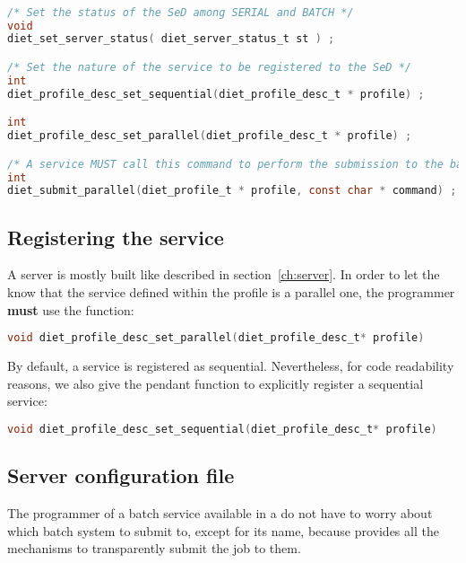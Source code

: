 \begin{lstlisting}[language=C,basewidth={.5em,.4em},fontadjust]

/* Set the status of the SeD among SERIAL and BATCH */
void 
diet_set_server_status( diet_server_status_t st ) ;

/* Set the nature of the service to be registered to the SeD */
int
diet_profile_desc_set_sequential(diet_profile_desc_t * profile) ;

int
diet_profile_desc_set_parallel(diet_profile_desc_t * profile) ;

/* A service MUST call this command to perform the submission to the batch system */
int
diet_submit_parallel(diet_profile_t * profile, const char * command) ;

\end{lstlisting}

\subsection{Registering the service}

A server is mostly built like described in section~\ref{ch:server}. In order to
let the \sed know that the service defined within the profile is a parallel
one, the \sed programmer {\bf must} use the function:

\begin{lstlisting}[language=c,basewidth={.5em,.4em},fontadjust]
void diet_profile_desc_set_parallel(diet_profile_desc_t* profile)
\end{lstlisting}

By default, a service is registered as sequential. Nevertheless, for
code readability reasons, we also give the pendant function to
explicitly register a sequential service:

\begin{lstlisting}[language=c,basewidth={.5em,.4em},fontadjust]
void diet_profile_desc_set_sequential(diet_profile_desc_t* profile)
\end{lstlisting}

\subsection{Server configuration file}

The programmer of a batch service available in a \sed do not have to worry
about which batch system to submit to, except for its name, because \diet
provides all the mechanisms to transparently submit the job to them.

